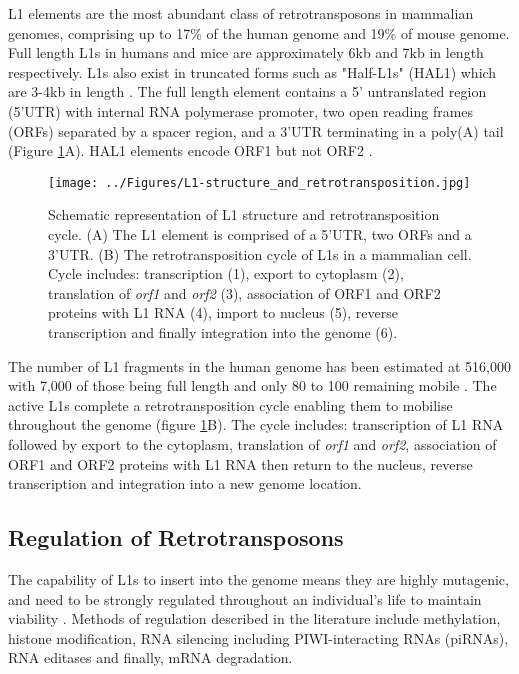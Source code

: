 \documentclass[12pt]{article}
\begin{document}
			L1 elements are the most abundant class of retrotransposons in mammalian genomes, comprising up to 17\%  of the human genome and 19\% of mouse genome\citep{Graham06,Belancio08,Bodak14}.
			Full length L1s in humans and mice are approximately 6kb and 7kb in length respectively.
			L1s also exist in truncated forms such as "Half-L1s" (HAL1) which are 3-4kb in length \citep{Bao10}.
			The full length element contains a 5' untranslated region (5'UTR) with internal RNA polymerase promoter, two open reading frames (ORFs) separated by a spacer region, and a 3'UTR terminating in a poly(A) tail (Figure \ref{L1-structure-RT}A)\citep{Belancio07,Bodak14}.
			HAL1 elements encode ORF1 but not ORF2 \citep{Bao14}. 
			
				\begin{figure}[tb] %
					\centering
					\texttt{[image: ../Figures/L1-structure\_and\_retrotransposition.jpg]}
					\caption{Schematic representation of L1 structure and retrotransposition cycle.
					(A) The L1 element is comprised of a 5'UTR, two ORFs and a 3'UTR.
					(B) The retrotransposition cycle of L1s in a mammalian cell.
					Cycle includes: transcription (1), export to cytoplasm (2), translation of \textit{orf1} and \textit{orf2} (3), association of ORF1 and ORF2 proteins with L1 RNA (4), import to nucleus (5), reverse transcription and finally integration into the genome (6). \citep[adapted from:][]{Bodak14}}
					\label{L1-structure-RT}
				\end{figure}

			The number of L1 fragments in the human genome has been estimated at 516,000 \citep{Lander01} with 7,000 of those being full length \citep{Khan03} and only 80 to 100 remaining mobile \citep{Brouha03}.
			The active L1s complete a retrotransposition cycle enabling them to mobilise throughout the genome (figure \ref{L1-structure-RT}B).
			The cycle includes: transcription of L1 RNA followed by export to the cytoplasm, translation of \textit{orf1} and \textit{orf2}, association of ORF1 and ORF2 proteins with L1 RNA then return to the nucleus, reverse transcription and integration into a new genome location. 
			


		\subsection{Regulation of Retrotransposons}
			
			The capability of L1s to insert into the genome means they are highly mutagenic, and need to be strongly regulated throughout an individual's life to maintain viability \citep{Garcia-Perez10, Castaneda11}.
			Methods of regulation described in the literature include methylation, histone modification, RNA silencing including PIWI-interacting RNAs (piRNAs), RNA editases and finally, mRNA degradation. 
			
\end{document}
